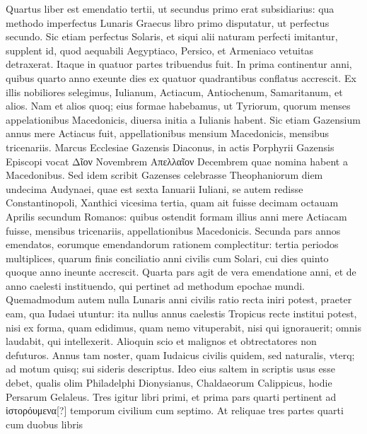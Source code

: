 Quartus liber est emendatio
tertii, ut secundus primo erat subsidiarius: qua methodo imperfectus
Lunaris Graecus libro primo disputatur, ut perfectus secundo.
Sic etiam perfectus Solaris, et siqui alii naturam perfecti imitantur,
supplent id, quod aequabili Aegyptiaco, Persico, et Armeniaco
vetuitas detraxerat.
Itaque in quatuor partes tribuendus fuit.
In
prima continentur anni, quibus quarto anno exeunte dies ex quatuor
quadrantibus conflatus accrescit.
Ex illis nobiliores selegimus,
Iulianum, Actiacum, Antiochenum, Samaritanum, et alios. 
Nam et alios quoq; eius formae habebamus, ut Tyriorum, quorum menses
appelationibus Macedonicis, diuersa initia a Iulianis habent.
Sic
etiam Gazensium annus mere Actiacus fuit, appellationibus mensium 
Macedonicis, mensibus tricenariis. 
Marcus Ecclesiae Gazensis Diaconus,
in actis Porphyrii Gazensis Episcopi vocat \textgreek{Δῖον} Novembrem
\textgreek{Απελλαῖον} Decembrem quae nomina habent a Macedonibus. 
Sed
idem scribit Gazenses celebrasse Theophaniorum diem undecima
Audynaei, quae est sexta Ianuarii Iuliani, se autem redisse Constantinopoli,
Xanthici vicesima tertia, quam ait fuisse decimam octauam
Aprilis secundum Romanos: quibus ostendit formam illius anni mere
Actiacam fuisse, mensibus tricenariis, appellationibus Macedonicis. 
Secunda pars annos emendatos, eorumque emendandorum
rationem complectitur: tertia periodos multiplices, quarum finis
conciliatio anni civilis cum Solari, cui dies quinto quoque anno
ineunte accrescit.
%
Quarta pars agit de vera emendatione anni, et
de anno caelesti instituendo, qui pertinet ad methodum epochae
mundi.
Quemadmodum autem nulla Lunaris anni civilis ratio
recta iniri potest, praeter eam, qua Iudaei utuntur: ita nullus annus
caelestis Tropicus recte institui potest, nisi ex forma, quam edidimus,
quam nemo vituperabit, nisi qui ignorauerit; omnis laudabit,
qui intellexerit.
Alioquin scio et malignos et obtrectatores non defuturos. 
Annus tam noster, quam Iudaicus civilis quidem, sed naturalis,
vterq; ad motum quisq; sui sideris descriptus. 
Ideo eius saltem
in scriptis usus esse debet, qualis olim Philadelphi Dionysianus,
Chaldaeorum Calippicus, hodie Persarum Gelaleus. 
Tres igitur libri
primi, et prima pars quarti pertinent ad \textgreek{ἱστορόυμενα[?]}
 temporum civilium
cum septimo.
At reliquae tres partes quarti cum duobus libris
